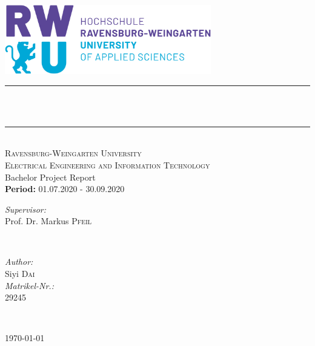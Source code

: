 \begin{titlepage}

\newcommand{\HRule}{\rule{\linewidth}{0.3mm}} %


\center %
\includegraphics[width=9cm]{title/logo.png}\\[1.5cm]


\makeatletter
\HRule \\[0.8cm]
{ \huge \bfseries \@title}\\[0.4cm] %
\HRule \\[0.5cm]


\textsc{\Large Ravensburg-Weingarten University}\\[0.3cm] 
\textsc{\large Electrical Engineering and Information Technology}\\ [1.5cm]


\large Bachelor Project Report  \large\\
\textbf{Period:} 01.07.2020 - 30.09.2020\large\



\vspace{2.5cm}

\begin{minipage}{0.4\textwidth}
\begin{flushleft} \large
\emph{Supervisor:} \\ Prof. Dr. Markus \textsc{Pfeil} 
\end{flushleft}
\end{minipage}
~
\begin{minipage}{0.4\textwidth}
\begin{flushright}\large
\emph{Author:}\\ Siyi \textsc{Dai} \\
\emph{Matrikel-Nr.:}\\ 29245 \\

\end{flushright}
\end{minipage}\\[2cm]

\makeatother

{\large \today}\\[7cm] 



\vfill %

\end{titlepage}



